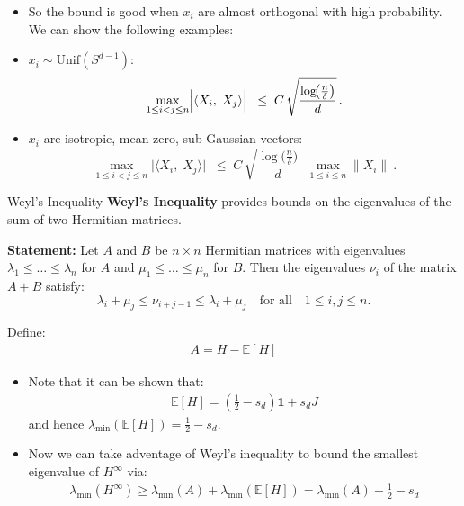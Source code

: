\documentclass[serif, aspectratio=169]{beamer}
\begin{document}
\begin{frame}
	\begin{itemize}

	\item So the bound is good when \(x_i\) are almost orthogonal with high probability. We can show the following examples:
	
	\item \(x_i \sim \text{Unif}(S^{d-1})\):
	\[
	\max_{1 \le i < j \le n}
	\Bigl|\langle X_i,\;X_j\rangle\Bigr|
	\;\;\le\;
	C\,
	\sqrt{\frac{\log\!\bigl(\tfrac{n}{\delta}\bigr)}{d}}
	\,.
	\]
	
	\item \(x_i\) are isotropic, mean-zero, sub-Gaussian vectors:
	\[
	\max_{1 \le i < j \le n}
	\bigl|\langle X_i,\;X_j\rangle\bigr|
	\;\;\le\;
	C\,
	\sqrt{\frac{\log\!\bigl(\tfrac{n}{\delta}\bigr)}{d}}
	\;\;\max_{1\le i\le n}\|X_i\|\ .
	\]
	\end{itemize}
	
\end{frame}


\begin{frame}{Weyl's Inequality}
    \textbf{Weyl's Inequality} provides bounds on the eigenvalues of the sum of two Hermitian matrices.

    \vspace{0.5cm}
    
    \textbf{Statement:} Let \( A \) and \( B \) be \( n \times n \) Hermitian matrices with eigenvalues \( \lambda_1 \leq \dots \leq \lambda_n \) for \( A \) and \( \mu_1 \leq \dots \leq \mu_n \) for \( B \). Then the eigenvalues \( \nu_i \) of the matrix \( A + B \) satisfy:
    \[
    \lambda_i + \mu_j \leq \nu_{i+j-1} \leq \lambda_i + \mu_j \quad \text{for all} \quad 1 \leq i,j \leq n.
    \]
\end{frame}

\begin{frame}
	Define:
	\begin{align*}
		A = H - \mathbb{E}[H] 
	\end{align*}
	\begin{itemize}
		\item Note that it can be shown that:
		\begin{align*}
			\mathbb{E}[H] = (\frac{1}{2} -s_d) \mathbf{1} + s_d J
		\end{align*}
		and hence \( \lambda_{\min}(\mathbb{E}[H]) = \frac{1}{2} - s_d \).
		\item Now we can take adventage of Weyl's inequality to bound the smallest eigenvalue of \(H^\infty\) via:
			\begin{align*}
				\lambda_{\min}(H^\infty) \geq \lambda_{\min}(A) + \lambda_{\min}(\mathbb{E}[H]) = \lambda_{\min}(A) + \frac{1}{2} - s_d
			\end{align*}
	\end{itemize}
\end{frame}
\end{document}
